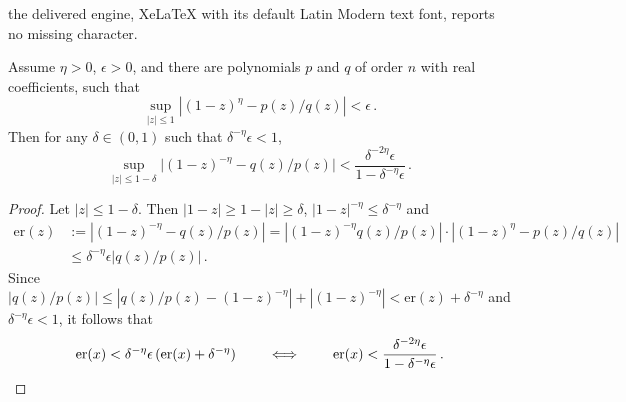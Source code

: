 \documentclass[10pt,a4paper]{amsart}
\newcommand{\abs}[1]{\left| #1 \right|}
\begin{document}
the delivered engine, XeLaTeX with its default Latin Modern text font, reports no missing character.
\begin{lemma} \label{lem:inversion-trick}   Assume $\eta > 0$, $\epsilon > 0$, and there are  polynomials $p$ and $q$ of order $n$ with real coefficients, such that 
%
$$ \sup_{|z| \leq 1} \left|(1 - z)^{\eta} - p(z) / q(z) \right| < \epsilon \, .$$
%
Then for  any $\delta \in( 0,1)$ such that $\delta^{-\eta} \epsilon < 1$,
%
$$\sup_{|z| \leq 1 - \delta} \big| (1 - z)^{-\eta} - q(z) / p(z) \big| < \frac{\delta^{-2 \eta}\epsilon}{1 - \delta^{-\eta} \epsilon} \, .$$
\end{lemma}

\begin{proof} 
 Let $\abs{z}\leq 1-\delta$. Then  $\abs{1 - z} \geq 1 - \abs{z} \geq \delta$, $\abs{1 - z}^{-\eta} \leq \delta^{-\eta}$  and 
\begin{align*} 
\text{er}(z) &\!:= \abs{(1-z)^{-\eta} - q(z) / p(z)} 
= \abs{(1-z)^{-\eta} q(z) / p(z)} \cdot \abs{(1-z)^{\eta} - p(z) / q(z)} \\ & \leq \delta^{-\eta} \epsilon \big|q(z) / p(z)\big| \, .
\end{align*}
%
 Since $ \abs{q(z) / p(z)} \leq \abs{q(z) / p(z) - (1 - z)^{-\eta}} +  \abs{(1 - z)^{-\eta}} < \text{er}(z) + \delta^{-\eta}$ and $\delta^{-\eta} \epsilon < 1$, it follows that 
%
\begin{equation*}
\text{er}(x) < \delta^{-\eta} \epsilon \, (\text{er}(x) + \delta^{-\eta}) 
% 
\qquad \iff\qquad 
\text{er}(x) < \frac{\delta^{-2 \eta}\epsilon}{1 - \delta^{-\eta} \epsilon} \, . \qedhere
\end{equation*}
\end{proof}
\end{document}
